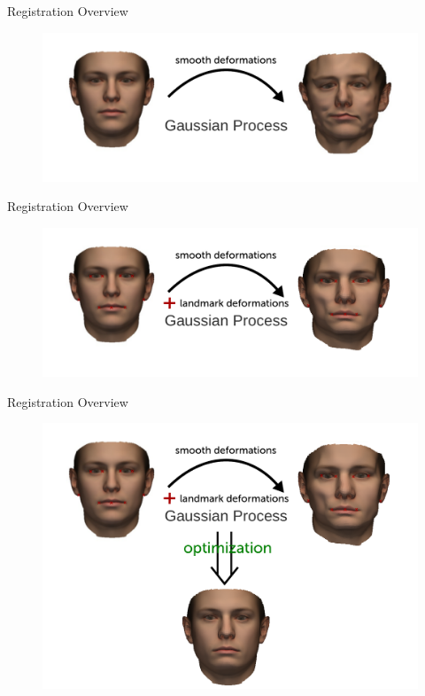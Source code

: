 \documentclass[xcolor=x11names,compress]{beamer}
\begin{document}
    \begin{frame}{Registration Overview}
        \begin{figure}
            \includegraphics[width=\textwidth]{../resources/figures/intro3.pdf}
        \end{figure}
    \end{frame}

    \begin{frame}{Registration Overview}
        \begin{figure}
            \includegraphics[width=\textwidth]{../resources/figures/intro4.pdf}
        \end{figure}
    \end{frame}


    \begin{frame}{Registration Overview}
        \begin{figure}
            \includegraphics[width=\textwidth]{../resources/figures/intro5.pdf}
        \end{figure}
    \end{frame}
\end{document}
